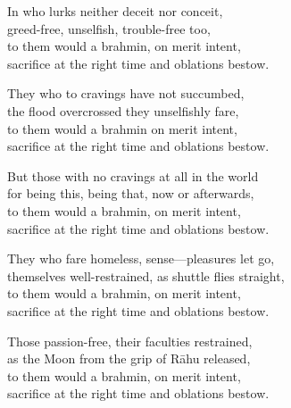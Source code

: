 \begin{MyDescription}{}
In who lurks neither deceit nor conceit,\\
greed-free, unselfish, trouble-free too,\\
to them would a brahmin, on merit intent,\\
sacrifice at the right time and oblations bestow.
\end{MyDescription}

\begin{MyDescription}{}
They who to cravings have not succumbed,\\
the flood overcrossed they unselfishly fare,\\
to them would a brahmin on merit intent,\\
sacrifice at the right time and oblations bestow.

\end{MyDescription}

\begin{MyDescription}{}
But those with no cravings at all in the world\\
for being this, being that, now or afterwards,\\
to them would a brahmin, on merit intent,\\
sacrifice at the right time and oblations bestow.
\end{MyDescription}

\begin{MyDescription}{}
They who fare homeless, sense—pleasures let go,\\
themselves well-restrained, as shuttle ﬂies straight,\\
to them would a brahmin, on merit intent,\\
sacrifice at the right time and oblations bestow.
\end{MyDescription}

\begin{MyDescription}{}
Those passion-free, their faculties restrained,\\
as the Moon from the grip of R\=ahu released,\\
to them would a brahmin, on merit intent,\\
sacrifice at the right time and oblations bestow.
\end{MyDescription}


